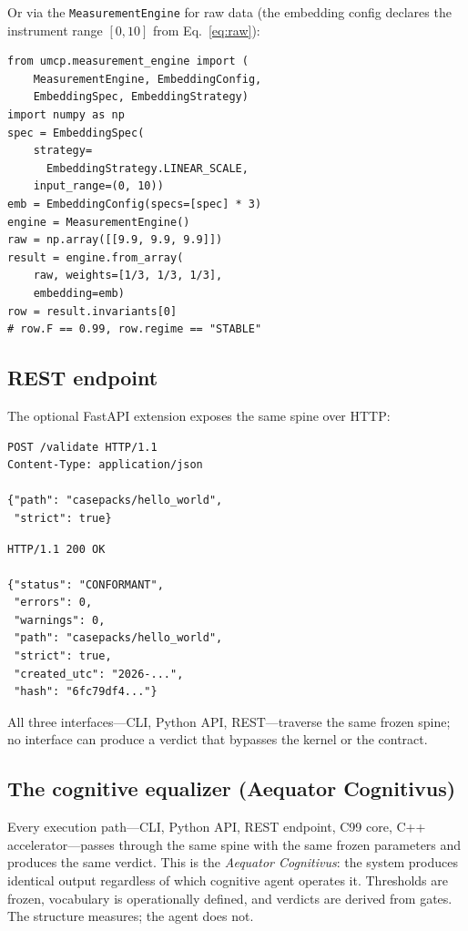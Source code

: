 \documentclass[
  aps,
  prd,
  twocolumn,
  superscriptaddress,
  nofootinbib,
  floatfix
]{revtex4-2}
\begin{document}
Or via the \texttt{MeasurementEngine} for raw data
(the embedding config declares the instrument range
$[0, 10]$ from Eq.~\eqref{eq:raw}):

\begin{Verbatim}[fontsize=\small]
from umcp.measurement_engine import (
    MeasurementEngine, EmbeddingConfig,
    EmbeddingSpec, EmbeddingStrategy)
import numpy as np
spec = EmbeddingSpec(
    strategy=
      EmbeddingStrategy.LINEAR_SCALE,
    input_range=(0, 10))
emb = EmbeddingConfig(specs=[spec] * 3)
engine = MeasurementEngine()
raw = np.array([[9.9, 9.9, 9.9]])
result = engine.from_array(
    raw, weights=[1/3, 1/3, 1/3],
    embedding=emb)
row = result.invariants[0]
# row.F == 0.99, row.regime == "STABLE"
\end{Verbatim}

\subsection{REST endpoint}

The optional FastAPI extension exposes the same spine over HTTP:

\begin{Verbatim}[fontsize=\small]
POST /validate HTTP/1.1
Content-Type: application/json

{"path": "casepacks/hello_world",
 "strict": true}
\end{Verbatim}

\begin{Verbatim}[fontsize=\small]
HTTP/1.1 200 OK

{"status": "CONFORMANT",
 "errors": 0,
 "warnings": 0,
 "path": "casepacks/hello_world",
 "strict": true,
 "created_utc": "2026-...",
 "hash": "6fc79df4..."}
\end{Verbatim}

All three interfaces---CLI, Python API, REST---traverse the same
frozen spine; no interface can produce a verdict that bypasses the
kernel or the contract.

\subsection{The cognitive equalizer (Aequator Cognitivus)}

Every execution path---CLI, Python API, REST endpoint, C99 core,
C++ accelerator---passes through the same spine with the same frozen
parameters and produces the same verdict.  This is the
\emph{Aequator Cognitivus}: the system produces identical output
regardless of which cognitive agent operates it.  Thresholds are
frozen, vocabulary is operationally defined, and verdicts are derived
from gates.  The structure measures; the agent does not.
\end{document}
